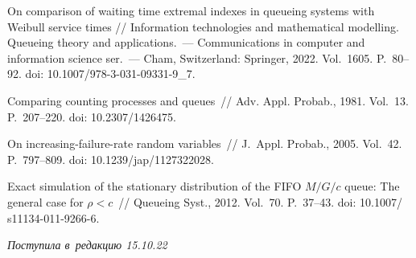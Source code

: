 \begin{multicols}{2}
{{\begin{thebibliography}{99}
   On comparison of waiting time 
extremal indexes  in queueing systems with Weibull service times //
{Information technologies and mathematical modelling. Queueing theory and 
applications.}~--- Communications in computer and information science 
ser.~--- Cham, Switzerland: Springer, 2022. Vol.~1605. P.~80--92. doi: 
10.1007/978-3-031-09331-9\_7.

 Comparing counting processes and queues~// Adv. Appl. Probab., 
1981. Vol.~13. P.~207--220.  doi: 10.2307/1426475.


  On increasing-failure-rate random 
variables~// J.~Appl. Probab., 2005. Vol.~42. P.~797--809. doi: 
10.1239/jap/1127322028.



 Exact simulation of the stationary distribution of the FIFO 
$M/G/c$ queue: The general case for $\rho < c$~// Queueing Syst., 2012. Vol.~70. 
P.~37--43.
doi:  10.1007/ s11134-011-9266-6.
\end{thebibliography}

 }
 }

\end{multicols}

\vspace*{-6pt}

\hfill{\small\textit{Поступила в~редакцию 15.10.22}}



\newpage

\vspace*{-28pt}





\def\tit{ON BOUNDS OF THE  STATIONARY WAITING TIME EXTREMAL INDEX IN~$M/G/1$ SYSTEM WITH~MIXTURE SERVICE TIMES}


\def\titkol{On bounds of the  stationary waiting time extremal index in~$M/G/1$ system with~mixture service times}


\def\aut{I.\,V.~Peshkova$^{1,2}$}

\def\autkol{I.\,V.~Peshkova}

